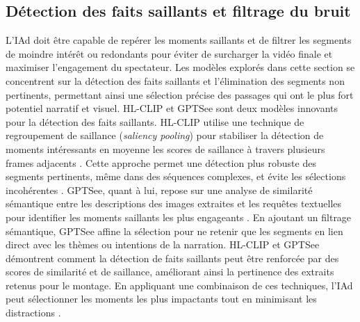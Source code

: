 \documentclass[livre]{udes-genie-these}
\begin{document}
\subsection{Détection des faits saillants et filtrage du bruit}
L'IAd doit être capable de repérer les moments saillants et de filtrer les segments de moindre intérêt ou redondants pour éviter de surcharger la vidéo finale et maximiser l'engagement du spectateur. Les modèles explorés dans cette section se concentrent sur la détection des faits saillants et l'élimination des segments non pertinents, permettant ainsi une sélection précise des passages qui ont le plus fort potentiel narratif et visuel.
HL-CLIP et GPTSee sont deux modèles innovants pour la détection des faits saillants. HL-CLIP utilise une technique de regroupement de saillance (\textit{saliency pooling}) pour stabiliser la détection de moments intéressants en moyenne les scores de saillance à travers plusieurs frames adjacents \cite{han2024_clip}\cite{sun2023_gptsee}. Cette approche permet une détection plus robuste des segments pertinents, même dans des séquences complexes, et évite les sélections incohérentes \cite{you2023_ferret}\cite{sun2023_gptsee}.
GPTSee, quant à lui, repose sur une analyse de similarité sémantique entre les descriptions des images extraites et les requêtes textuelles pour identifier les moments saillants les plus engageants \cite{sun2023_gptsee}\cite{liu2022_umt}. En ajoutant un filtrage sémantique, GPTSee affine la sélection pour ne retenir que les segments en lien direct avec les thèmes ou intentions de la narration.
HL-CLIP et GPTSee démontrent comment la détection de faits saillants peut être renforcée par des scores de similarité et de saillance, améliorant ainsi la pertinence des extraits retenus pour le montage. En appliquant une combinaison de ces techniques, l'IAd peut sélectionner les moments les plus impactants tout en minimisant les distractions \cite{han2024_clip}\cite{sun2023_gptsee}.
\end{document}
